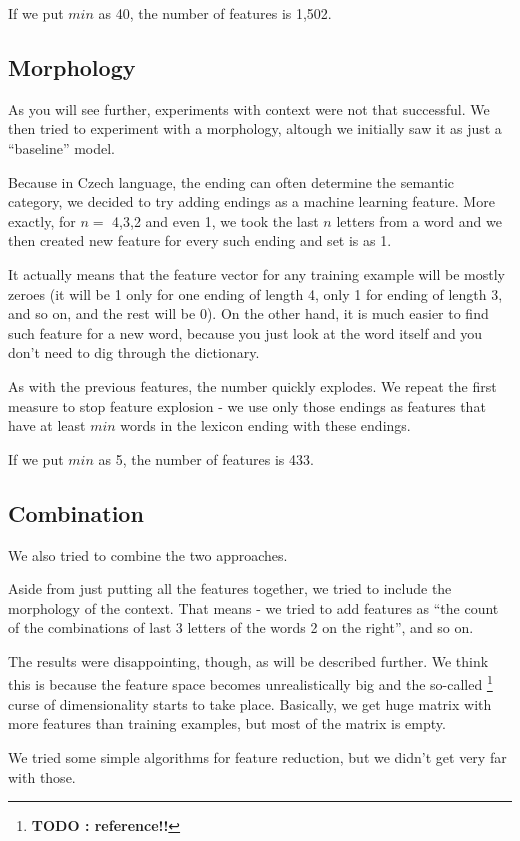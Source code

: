 \documentclass[letterpaper]{article}
\newcommand{\todofn}[1] {
 \footnote{\textbf{TODO : #1}}}
\begin{document}
If we put $min$ as 40, the number of features is 1,502.

\subsection{Morphology}
As you will see further, experiments with context were not that successful. 
We then tried to experiment with a morphology, altough we initially saw it as just a ``baseline'' model.

Because in Czech language, the ending can often determine the semantic category, 
we decided to try adding endings as a machine learning feature. 
More exactly, for $n=$ 4,3,2 and even 1, we took the last $n$ letters from 
a word and we then created new feature for every such ending and set is as 1.

It actually means that the feature vector for any training example will be mostly zeroes 
(it will be 1 only for one ending of length 4, only 1 for ending of length 3, and so on, 
and the rest will be 0). On the other hand, it is much easier to find such feature 
for a new word, because you just look at the word itself and you don't need to dig through the dictionary.

As with the previous features, the number quickly explodes. We repeat the first measure 
to stop feature explosion - we use only those endings as features that have at least $min$ words in the lexicon ending with these endings.

If we put $min$ as 5, the number of features is 433.

\subsection{Combination}
We also tried to combine the two approaches.

Aside from just putting all the features together, we tried to include the morphology of the context. 
That means - we tried to add features as ``the count of the combinations of last 3 letters of the words 2 on the right'', and so on.

The results were disappointing, though, as will be described further. 
We think this is because the feature space becomes unrealistically big and the so-called \todofn{reference!!} curse of dimensionality starts to take place. Basically, we get huge matrix with more features than training examples, but most of the matrix is empty.

We tried some simple algorithms for feature reduction, but we didn't get very far with those.
\end{document}
